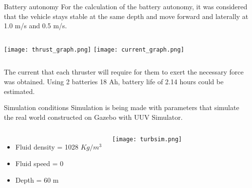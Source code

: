 \begin{frame}[c]{Battery autonomy}
  For the calculation of the battery autonomy, it was considered that the vehicle stays stable at the same depth and move forward and laterally at 1.0 m/s and 0.5 m/s.
  

  \begin{columns}
      \texttt{[image: thrust\_graph.png]}
      \texttt{[image: current\_graph.png]}
  \end{columns}

  The current that each thruster will require for them to exert the necessary force was obtained. Using 2 batteries 18 Ah, battery life of 2.14 hours could be estimated. 
\end{frame}

\begin{frame}[t]{Simulation conditions}
  \transdissolve[duration=0.5]
  Simulation is being made with parameters that simulate the real world constructed on Gazebo with UUV Simulator.
  \begin{columns}[c]
      \begin{itemize}
        \item Fluid density = 1028 $Kg / m^3$
        \item Fluid speed = 0
        \item Depth = 60 m
      \end{itemize}      
      \texttt{[image: turbsim.png]}
  \end{columns}
\end{frame}


